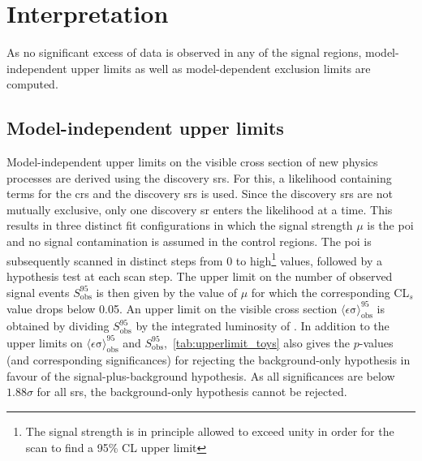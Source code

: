 \FloatBarrier

\section{Interpretation}\label{sec:results_interpretation}

As no significant excess of data is observed in any of the signal regions, model-independent upper limits as well as model-dependent exclusion limits are computed.

\subsection{Model-independent upper limits} 

Model-independent upper limits on the visible cross section of new physics processes are derived using the discovery \glspl{sr}. For this, a likelihood containing terms for the \glspl{cr} and the discovery \glspl{sr} is used. Since the discovery \glspl{sr} are not mutually exclusive, only one discovery \gls{sr} enters the likelihood at a time. This results in three distinct fit configurations in which the signal strength $\mu$ is the \gls{poi} and no signal contamination is assumed in the control regions. The \gls{poi} is subsequently scanned in distinct steps from 0 to high\footnote{The signal strength is in principle allowed to exceed unity in order for the scan to find a 95\% CL upper limit} values, followed by a hypothesis test at each scan step. The upper limit on the number of observed signal events $S_{\mathrm{ obs}}^{95}$ is then given by the value of $\mu$ for which the corresponding CL$_s$ value drops below 0.05. An upper limit on the visible cross section $\langle\epsilon{\mathrm{ \sigma}}\rangle_{\mathrm{ obs}}^{95}$ is obtained by dividing $S_{\mathrm{ obs}}^{95}$ by the integrated luminosity of \onethirtynineifb. In addition to the upper limits on $\langle\epsilon{\mathrm{ \sigma}}\rangle_{\mathrm{ obs}}^{95}$ and $S_{\mathrm{ obs}}^{95}$,~\cref{tab:upperlimit_toys} also gives the $p$-values (and corresponding significances) for rejecting the background-only hypothesis in favour of the signal-plus-background hypothesis. As all significances are below $1.88\sigma$ for all \glspl{sr}, the background-only hypothesis cannot be rejected.

